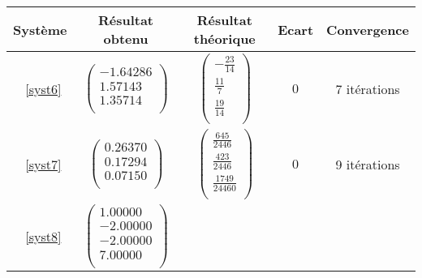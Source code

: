 \documentclass{report}
\begin{document}
         \renewcommand{\arraystretch}{1}
         \newpage
        \renewcommand{\arraystretch}{2}
        \begin{tabular}{|c|c|c|c|c|}
           \hline
           Système & Résultat obtenu & Résultat théorique & Ecart & Convergence \\ %
           \hline
           ~\eqref{syst6}
           &
           $\begin{pmatrix}
              -1.64286 \\
              1.57143 \\
              1.35714 \\
          \end{pmatrix}$
           &
           $\begin{pmatrix}
              -\frac{23}{14} \\
              \frac{11}{7} \\
              \frac{19}{14} \\
          \end{pmatrix}$
          &
          $0$
          &
          7 itérations \\
           \hline
           ~\eqref{syst7}
           &
           $\begin{pmatrix}
              0.26370 \\
              0.17294 \\
              0.07150 \\
          \end{pmatrix}$
           &
           $\begin{pmatrix}
              \frac{645}{2446} \\
              \frac{423}{2446} \\
              \frac{1749}{24460} \\
          \end{pmatrix}$
          &
          $0$
          &
          9 itérations \\
           \hline
           ~\eqref{syst8}
           &
           $\begin{pmatrix}
              1.00000 \\
              -2.00000 \\
              -2.00000 \\
              7.00000 \\
          \end{pmatrix}$

\end{tabular}
\end{document}
